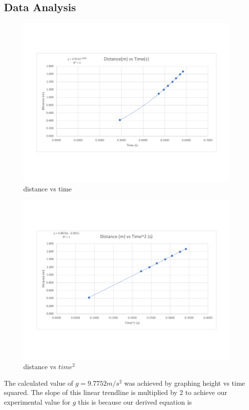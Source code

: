 \documentclass[12pt]{report}
\begin{document}
\subsection{Data Analysis}
\begin{figure}[H]
    \centering
    \includegraphics[width=\textwidth]{dvst}
    \caption{distance vs time}
    \label{fig:DvsT}
\end{figure}
\begin{figure}[H]
    \centering
    \includegraphics[width=\textwidth]{dvst^2}
    \caption{distance vs $time^{2}$}
    \label{fig:DvsT^2}
\end{figure}
The calculated value of $g = 9.7752 m/s^2$ was achieved by graphing height vs time squared. The slope of this linear trendline is multiplied by 2 to achieve our experimental value for $g$ this is because our derived equation is 
\end{document}
